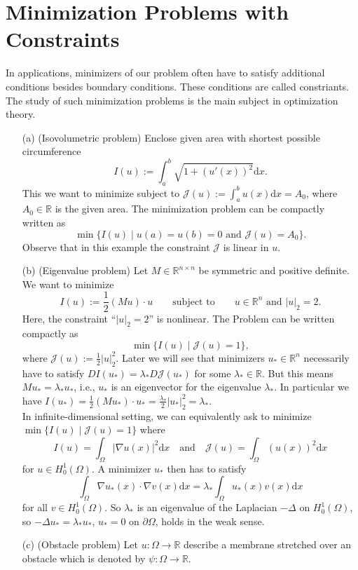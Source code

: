 \section{Minimization Problems with Constraints}
In applications, minimizers of our problem often have to satisfy additional conditions besides boundary conditions. These conditions are called constriants. The study of such minimization problems is the main subject in optimization theory.\\[11pt]

\begin{example}
\begin{itemize}
	\item[(a)] (Isovolumetric problem) Enclose given area with shortest possible circumference
	\[I(u):=\int_a^b{\sqrt{1+(u'(x))^2}\mathrm{d}x}.\]
	This we want to minimize subject to $\mathcal{J}(u):=\int_a^b{u(x)\mathrm{d}x}=A_0$, where $A_0\in\mathbb{R}$ is the given area. The minimization problem can be compactly written as
	\[\min\{I(u)\mid u(a)=u(b)=0\text{ and }\mathcal{J}(u)=A_0\}.\]
	Observe that in this example the constraint $\mathcal{J}$ is linear in $u$.
	\item[(b)] (Eigenvalue problem) Let $M\in\mathbb{R}^{n\times n}$ be symmetric and positive definite. We want to minimize
	\[I(u):=\frac{1}{2}(Mu)\cdot u\qquad\text{subject to}\qquad u\in\mathbb{R}^n\text{ and }\lvert u\rvert_2=2.\]
	Here, the constraint ``$\lvert u\rvert_2=2$'' is nonlinear. The Problem can be written compactly as
	\[\min\{I(u)\mid\mathcal{J}(u)=1\},\]
	where $\mathcal{J}(u):=\frac{1}{2}\lvert u\rvert_2^2$. Later we will see that minimizers $u_*\in\mathbb{R}^n$ necessarily have to satisfy $DI(u_*)=\lambda_* D\mathcal{J}(u_*)$ for some $\lambda_*\in\mathbb{R}$. But this means $Mu_*=\lambda_*u_*$, i.e., $u_*$ is an eigenvector for the eigenvalue $\lambda_*$. In particular we have $I(u_*)=\frac{1}{2}(Mu_*)\cdot u_*=\frac{\lambda_*}{2}\lvert u_*\rvert_2^2=\lambda_*$.\\

	In infinite-dimensional setting, we can equivalently ask to minimize $\min\{I(u)\mid\mathcal{J}(u)=1\}$ where
	\[I(u)=\int_\Omega{\lvert\nabla u(x)\rvert^2\mathrm{d}x}\quad\text{and}\quad\mathcal{J}(u)=\int_\Omega{(u(x))^2\mathrm{d}x}\]
	for $u\in H_0^1(\Omega)$. A minimizer $u_*$ then has to satisfy
	\[\int_\Omega{\nabla u_*(x)\cdot\nabla v(x)\mathrm{d}x}=\lambda_*\int_\Omega{u_*(x)v(x)\mathrm{d}x}\]
	for all $v\in H_0^1(\Omega)$. So $\lambda_*$ is an eigenvalue of the Laplacian $-\Delta$ on $H_0^1(\Omega)$, so $-\Delta u_*=\lambda_*u_*$, $u_*=0$ on $\partial\Omega$, holds in the weak sense.
	\item[(c)] (Obstacle problem) Let $u:\Omega\longrightarrow\mathbb{R}$ describe a membrane stretched over an obstacle which is denoted by $\psi:\Omega\longrightarrow\mathbb{R}$.\\


\end{itemize}
\end{example}
